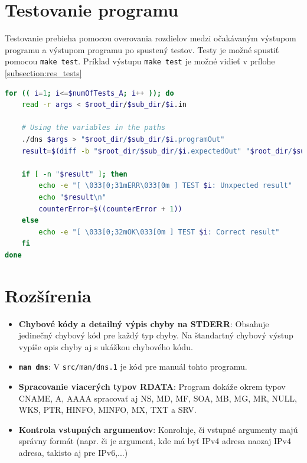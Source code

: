 \documentclass[a4paper, 11pt]{article}
\begin{document}
	\section{Testovanie programu}
	Testovanie prebieha pomocou overovania rozdielov medzi očakávaným výstupom programu a výstupom programu po spustený testov. Testy je možné spustiť pomocou \texttt{make test}.\newline
	Príklad výstupu \texttt{make test} je možné vidieť v prílohe \ref{subsection:res_tests}
	\begin{lstlisting}[language=BASH, caption={Ukážka kódu pre A testy}]
for (( i=1; i<=$numOfTests_A; i++ )); do
	read -r args < $root_dir/$sub_dir/$i.in
		
	# Using the variables in the paths
	./dns $args > "$root_dir/$sub_dir/$i.programOut"
	result=$(diff -b "$root_dir/$sub_dir/$i.expectedOut" "$root_dir/$sub_dir/$i.programOut")
		
	if [ -n "$result" ]; then
		echo -e "[ \033[0;31mERR\033[0m ] TEST $i: Unxpected result"
		echo "$result\n"
		counterError=$((counterError + 1))
	else
		echo -e "[ \033[0;32mOK\033[0m ] TEST $i: Correct result"
	fi
done
	\end{lstlisting}
	

	
	\section{Rozšírenia}
	\begin{itemize}
		\item \textbf{Chybové kódy a detailný výpis chyby na STDERR}: Obsahuje jedinečný chybový kód pre každý typ chyby. Na štandartný chybový výstup vypíše opis chyby aj s ukážkou chybového kódu.
		\item \textbf{\texttt{man dns}}: V \texttt{src/man/dns.1} je kód pre manuál tohto programu.
		\item \textbf{Spracovanie viacerých typov RDATA}: Program dokáže okrem typov CNAME, A, AAAA spracovať aj NS, MD, MF, SOA, MB, MG, MR, NULL, WKS, PTR, HINFO, MINFO, MX, TXT a SRV.
		\item \textbf{Kontrola vstupných argumentov}: Konroluje, či vstupné argumenty majú správny formát (napr. či je argument, kde má byť IPv4 adresa naozaj IPv4 adresa, takisto aj pre IPv6,...)
	\end{itemize}
	


\end{document}
